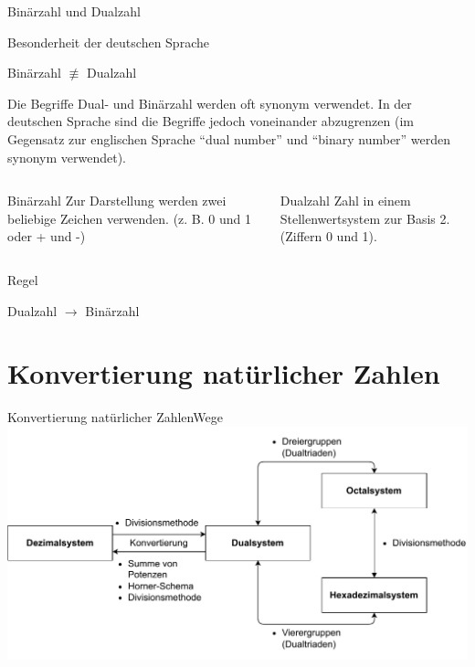 \documentclass[xelatex,aspectratio=169]{beamer}
\begin{document}
\begin{frame}{Binärzahl und Dualzahl}
  \begin{alertblock}{Besonderheit der deutschen Sprache}
    \begin{center}
      Binärzahl $\not\equiv$ Dualzahl
    \end{center}

    Die Begriffe Dual- und Binärzahl werden oft synonym verwendet. In der deutschen Sprache sind die Begriffe jedoch voneinander abzugrenzen (im Gegensatz zur englischen Sprache \enquote{dual number} und \enquote{binary number} werden synonym verwendet).
  \end{alertblock}
  \begin{columns}[onlytextwidth]
    \begin{column}{0.48\textwidth}
      \begin{block}{Binärzahl}
        Zur Darstellung werden zwei beliebige Zeichen verwenden. (z. B. 0 und 1 oder + und -)
      \end{block}
    \end{column}
    \begin{column}{0.48\textwidth}
      \begin{block}{Dualzahl}
        Zahl in einem Stellenwertsystem zur Basis 2. (Ziffern 0 und 1).
      \end{block}
    \end{column}
  \end{columns}
  \begin{block}{Regel}
    \begin{center}
      Dualzahl $\rightarrow$ Binärzahl
    \end{center}
  \end{block}
\end{frame}

\section{Konvertierung natürlicher Zahlen}

\begin{frame}{Konvertierung natürlicher Zahlen}{Wege}
  \includegraphics[width=\textwidth]{fig/zahlensysteme_umwandlung.pdf}
\end{frame}
\end{document}
